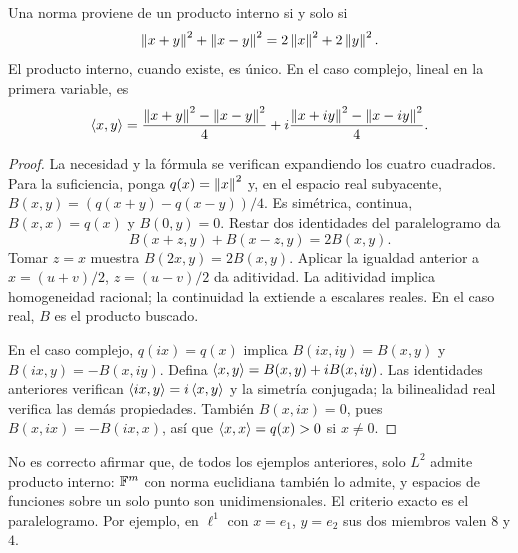 \begin{proposicion}\label{v3:polarizacion}
Una norma proviene de un producto interno si y solo si
\[
 \left\lVert x+y\right\rVert^2+\left\lVert x-y\right\rVert^2=2\left\lVert x\right\rVert^2+2\left\lVert y\right\rVert^2.
\]
El producto interno, cuando existe, es único. En el caso complejo, lineal en la primera variable, es
\[
 \left\langle x,y\right\rangle=\frac{\left\lVert x+y\right\rVert^2-\left\lVert x-y\right\rVert^2}{4}
 +i\frac{\left\lVert x+iy\right\rVert^2-\left\lVert x-iy\right\rVert^2}{4}.
\]
\end{proposicion}
\begin{proof}
La necesidad y la fórmula se verifican expandiendo los cuatro cuadrados. Para la suficiencia, ponga $q(x)=\left\lVert x\right\rVert^2$ y, en el espacio real subyacente, $B(x,y)=(q(x+y)-q(x-y))/4$. Es simétrica, continua, $B(x,x)=q(x)$ y $B(0,y)=0$. Restar dos identidades del paralelogramo da
\[
 B(x+z,y)+B(x-z,y)=2B(x,y).
\]
Tomar $z=x$ muestra $B(2x,y)=2B(x,y)$. Aplicar la igualdad anterior a $x=(u+v)/2$, $z=(u-v)/2$ da aditividad. La aditividad implica homogeneidad racional; la continuidad la extiende a escalares reales. En el caso real, $B$ es el producto buscado.

En el caso complejo, $q(ix)=q(x)$ implica $B(ix,iy)=B(x,y)$ y $B(ix,y)=-B(x,iy)$. Defina $\left\langle x,y\right\rangle=B(x,y)+iB(x,iy)$. Las identidades anteriores verifican $\left\langle ix,y\right\rangle=i\left\langle x,y\right\rangle$ y la simetría conjugada; la bilinealidad real verifica las demás propiedades. También $B(x,ix)=0$, pues $B(x,ix)=-B(ix,x)$, así que $\left\langle x,x\right\rangle=q(x)>0$ si $x\ne0$.
\end{proof}
\begin{observacion}
No es correcto afirmar que, de todos los ejemplos anteriores, solo $L^2$ admite producto interno: $\mathbb F^m$ con norma euclidiana también lo admite, y espacios de funciones sobre un solo punto son unidimensionales. El criterio exacto es el paralelogramo. Por ejemplo, en $\ell^1$ con $x=e_1$, $y=e_2$ sus dos miembros valen $8$ y $4$.
\end{observacion}

